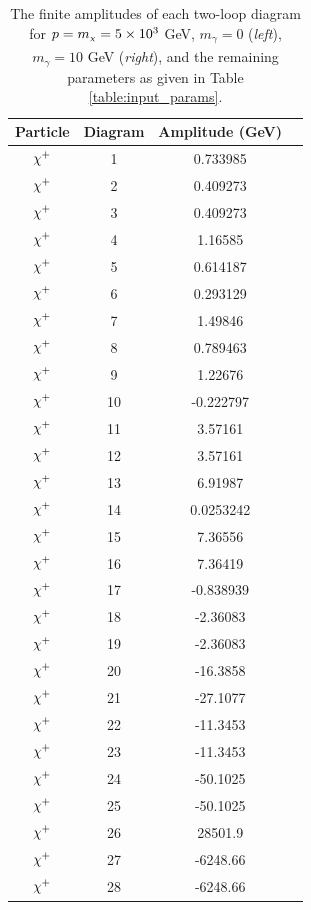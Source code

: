 \documentclass[11pt]{article}
\newcommand{\mychi}{\raisebox{0pt}[1ex][1ex]{\tiny$\chi$}}
\newcommand{\mychibig}{\raisebox{0pt}[1ex][1ex]{$\chi$}}
\def\mc{m_{\mychi}}
\begin{document}
\begin{table}[h!]
\caption{The finite amplitudes of each two-loop diagram for $p=\mc=5\times10^3$ GeV, $m_{\gamma}=0$ (\textit{left}), $m_{\gamma}=10$ GeV (\textit{right}), and the remaining parameters as given in Table \ref{table:input_params}.}\label{table:diagram_amp_2_a}
\centering
\vspace{0.2cm}
\begin{tabular}{c c c c}
Particle & Diagram & Amplitude (GeV) \\
\hline
$\mychibig^+$ & 1 & 0.733985 \\ 
$\mychibig^+$ & 2 & 0.409273 \\ 
$\mychibig^+$ & 3 & 0.409273 \\ 
$\mychibig^+$ & 4 & 1.16585 \\ 
$\mychibig^+$ & 5 & 0.614187 \\ 
$\mychibig^+$ & 6 & 0.293129 \\ 
$\mychibig^+$ & 7 & 1.49846 \\ 
$\mychibig^+$ & 8 & 0.789463 \\ 
$\mychibig^+$ & 9 & 1.22676 \\ 
$\mychibig^+$ & 10 & -0.222797 \\ 
$\mychibig^+$ & 11 & 3.57161 \\ 
$\mychibig^+$ & 12 & 3.57161 \\ 
$\mychibig^+$ & 13 & 6.91987 \\ 
$\mychibig^+$ & 14 & 0.0253242 \\ 
$\mychibig^+$ & 15 & 7.36556 \\ 
$\mychibig^+$ & 16 & 7.36419 \\ 
$\mychibig^+$ & 17 & -0.838939 \\ 
$\mychibig^+$ & 18 & -2.36083 \\ 
$\mychibig^+$ & 19 & -2.36083 \\ 
$\mychibig^+$ & 20 & -16.3858 \\ 
$\mychibig^+$ & 21 & -27.1077 \\ 
$\mychibig^+$ & 22 & -11.3453 \\ 
$\mychibig^+$ & 23 & -11.3453 \\ 
$\mychibig^+$ & 24 & -50.1025 \\ 
$\mychibig^+$ & 25 & -50.1025 \\ 
\rowcolor{green}$\mychibig^+$ & 26 & 28501.9 \\ 
\rowcolor{green}$\mychibig^+$ & 27 & -6248.66 \\ 
\rowcolor{green}$\mychibig^+$ & 28 & -6248.66 \\ 

\end{tabular}
\end{table}
\end{document}
